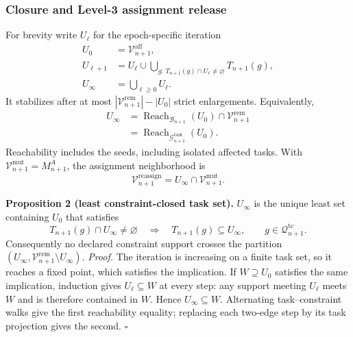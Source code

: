 \subsubsection{Closure and Level-3 assignment release}
For brevity write $U_\ell$ for the epoch-specific iteration
\begin{equation}
\begin{split}
U_0&=\mathcal V_{n+1}^{\mathrm{aff}},\\
U_{\ell+1}&=U_\ell\cup
\bigcup_{g:\,T_{n+1}(g)\cap U_\ell\ne\varnothing}T_{n+1}(g),\\
U_\infty&=\bigcup_{\ell\ge0}U_\ell.
\end{split}
\label{eq:task_closure_iteration}
\end{equation}
It stabilizes after at most
$|\mathcal V_{n+1}^{\mathrm{rem}}|-|U_0|$ strict enlargements. Equivalently,
\begin{equation}
\begin{split}
U_\infty
&=\operatorname{Reach}_{\mathcal B_{n+1}}(U_0)
\cap\mathcal V_{n+1}^{\mathrm{rem}}\\
&=\operatorname{Reach}_{\mathcal G_{n+1}^{\mathrm{task}}}(U_0).
\end{split}
\label{eq:task_closure_reachability}
\end{equation}
Reachability includes the seeds, including isolated affected tasks.
With $\mathcal V_{n+1}^{\mathrm{mut}}=M_{n+1}^A$, the assignment
neighborhood is
\begin{equation}
\mathcal V_{n+1}^{\mathrm{reassign}}
=U_\infty\cap\mathcal V_{n+1}^{\mathrm{mut}}.
\label{eq:reassignment_neighborhood}
\end{equation}

\medskip
\noindent\textbf{Proposition 2 (least constraint-closed task set).}
$U_\infty$ is the unique least set containing $U_0$ that satisfies
\begin{equation}
T_{n+1}(g)\cap U_\infty\ne\varnothing
\quad\Longrightarrow\quad T_{n+1}(g)\subseteq U_\infty,
\qquad g\in\mathcal Q_{n+1}^{\mathrm{tc}}.
\label{eq:constraint_closed_tasks}
\end{equation}
Consequently no declared constraint support crosses the partition
$(U_\infty,\mathcal V_{n+1}^{\mathrm{rem}}\setminus U_\infty)$.
\emph{Proof.}
The iteration is increasing on a finite task set, so it reaches a fixed
point, which satisfies the implication. If $W\supseteq U_0$ satisfies
the same implication, induction gives $U_\ell\subseteq W$ at every step:
any support meeting $U_\ell$ meets $W$ and is therefore contained in $W$.
Hence $U_\infty\subseteq W$. Alternating task--constraint walks give the
first reachability equality; replacing each two-edge step by its task
projection gives the second. \hfill$\square$

